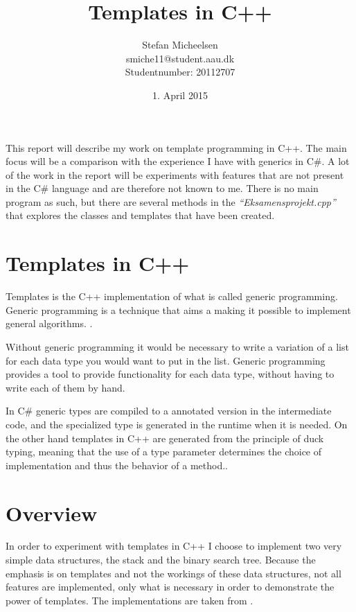 


\title{Templates in C++ }
\author{Stefan Micheelsen \\smiche11@student.aau.dk \\Studentnumber: 20112707}
\date{1. April 2015}

\newcommand{\file}[1]
{
	\textit{\color{gray} ``#1''}
}





\maketitle

This report will describe my work on template programming in C++.
The main focus will be a comparison with the experience I have with generics in C\#.
A lot of the work in the report will be experiments with features that are not present in the C\# language and are therefore not known to me.
There is no main program as such, but there are several methods in the \file{Eksamensprojekt.cpp} that explores the classes and templates that have been created.


\section{Templates in C++}
Templates is the C++ implementation of what is called generic programming.
Generic programming is a technique that aims a making it possible to implement general algorithms. \cite[p.~700]{stroustrup2013c++}.

Without generic programming it would be necessary to write a variation of a list for each data type you would want to put in the list.
Generic programming provides a tool to provide functionality for each data type, without having to write each of them by hand.

In C\# generic types are compiled to a annotated version in the intermediate code, and the specialized type is generated in the runtime when it is needed\cite{genericruntime}.
On the other hand templates in C++ are generated from the principle of duck typing, meaning that the use of a type parameter determines the choice of implementation and thus the behavior of a method.\cite[p.~700]{stroustrup2013c++}.

\section{Overview}
In order to experiment with templates in C++ I choose to implement two very simple data structures, the stack and the binary search tree.
Because the emphasis is on templates and not the workings of these data structures, not all features are implemented, only what is necessary in order to demonstrate the power of templates.
The implementations are taken from \citet{algo}.

